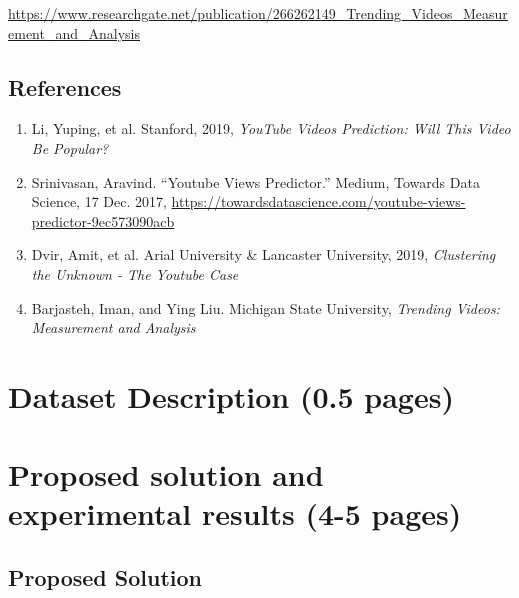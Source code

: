 \documentclass{article}
\begin{document}
\href{https://www.researchgate.net/publication/266262149_Trending_Videos_Measurement_and_Analysis}{https://www.researchgate.net/publication/266262149\_Trending\_Videos\_Measurement\_and\_Analysis} 

\subsection*{References}
\begin{enumerate}
  \item Li, Yuping, et al. Stanford, 2019, \textit{YouTube Videos Prediction: Will This Video Be Popular?} 
  \item Srinivasan, Aravind. “Youtube Views Predictor.” Medium, Towards Data Science, 17 Dec. 2017, \href{https://towardsdatascience.com/youtube-views-predictor-9ec573090acb}{https://towardsdatascience.com/youtube-views-predictor-9ec573090acb}
  \item Dvir, Amit, et al. Arial University \& Lancaster University, 2019, \textit{Clustering the Unknown - The Youtube Case}
  \item Barjasteh, Iman, and Ying Liu. Michigan State University, \textit{Trending Videos: Measurement and Analysis}
\end{enumerate}


\section*{Dataset Description (0.5 pages)}
\pagebreak
\section*{Proposed solution and experimental results (4-5 pages)}
\subsection*{Proposed Solution}
\end{document}
